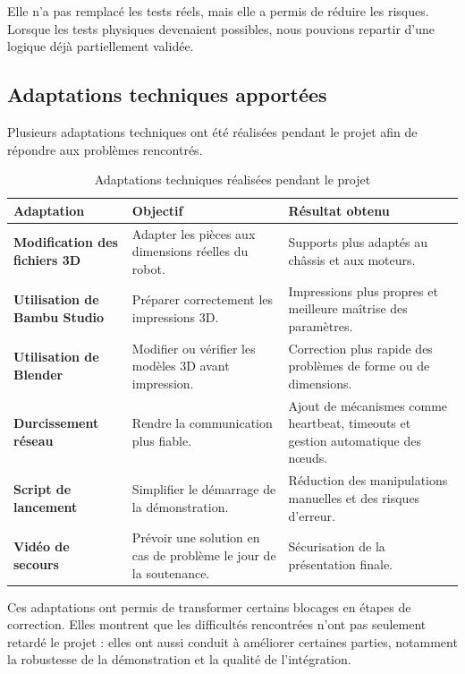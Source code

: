 \documentclass[11pt,a4paper]{report}
\begin{document}
Elle n'a pas remplacé les tests réels, mais elle a permis de réduire les risques. Lorsque les tests physiques devenaient possibles, nous pouvions repartir d'une logique déjà partiellement validée.

\subsection{Adaptations techniques apportées}

Plusieurs adaptations techniques ont été réalisées pendant le projet afin de répondre aux problèmes rencontrés.

\begin{table}[H]
\centering
\small
\renewcommand{\arraystretch}{1.25}
\begin{tabular}{|p{4.1cm}|p{5.3cm}|p{5.2cm}|}
\hline
\textbf{Adaptation} & \textbf{Objectif} & \textbf{Résultat obtenu} \\
\hline
\textbf{Modification des fichiers 3D} &
Adapter les pièces aux dimensions réelles du robot. &
Supports plus adaptés au châssis et aux moteurs. \\
\hline
\textbf{Utilisation de Bambu Studio} &
Préparer correctement les impressions 3D. &
Impressions plus propres et meilleure maîtrise des paramètres. \\
\hline
\textbf{Utilisation de Blender} &
Modifier ou vérifier les modèles 3D avant impression. &
Correction plus rapide des problèmes de forme ou de dimensions. \\
\hline
\textbf{Durcissement réseau} &
Rendre la communication plus fiable. &
Ajout de mécanismes comme heartbeat, timeouts et gestion automatique des nœuds. \\
\hline
\textbf{Script de lancement} &
Simplifier le démarrage de la démonstration. &
Réduction des manipulations manuelles et des risques d'erreur. \\
\hline
\textbf{Vidéo de secours} &
Prévoir une solution en cas de problème le jour de la soutenance. &
Sécurisation de la présentation finale. \\
\hline
\end{tabular}
\caption{Adaptations techniques réalisées pendant le projet}
\label{tab:adaptations_techniques}
\end{table}

Ces adaptations ont permis de transformer certains blocages en étapes de correction. Elles montrent que les difficultés rencontrées n'ont pas seulement retardé le projet : elles ont aussi conduit à améliorer certaines parties, notamment la robustesse de la démonstration et la qualité de l'intégration.
\end{document}
